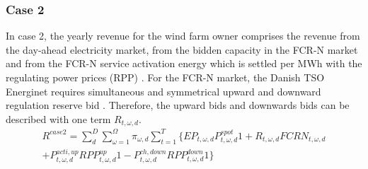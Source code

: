 \documentclass[final,5p,times,twocolumn,authoryear]{elsarticle}
\begin{document}
\subsubsection{Case 2}
In case 2, the yearly revenue for the wind farm owner comprises the revenue from the day-ahead electricity market, from the bidden capacity in the FCR-N market and from the FCR-N service activation energy which is settled per MWh with the regulating power prices (RPP) \cite{symmetrical}. For the FCR-N market, the Danish TSO Energinet requires simultaneous and symmetrical upward and downward regulation reserve bid \cite{symmetrical}. Therefore, the upward bids and downwards bids can be described with one term $R_{t,\omega,d}$. 
\begin{equation} \label{eq:revenue3}
\begin{split}
R^{case2} =\sum_{d}^D \sum_{\omega =1}^{\Omega}\pi_{\omega,d}\sum_{t = 1}^T \{ EP_{t,\omega,d}P_{t,\omega,d}^{spot}1 + R_{t,\omega,d}FCRN_{t,\omega,d} \\+ P_{t,\omega,d}^{acti,up}RPP_{t,\omega,d}^{up}1 - P_{t,\omega,d}^{ch,down}RPP_{t,\omega,d}^{down}1 \}
\end{split}
\end{equation}
\end{document}
